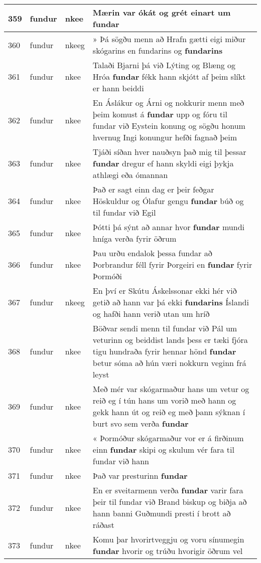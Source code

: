 \documentclass{article}
\begin{document}
\begin{longtable}{p{1cm}|p{1cm}|p{1cm}|p{13cm}}
\hline
359&fundur&nkee&Mærin var ókát og grét einart um \textbf{fundar} \\
\hline
360&fundur&nkeeg&» Þá sögðu menn að Hrafn gætti eigi miður skógarins en fundarins og \textbf{fundarins} \\
\hline
361&fundur&nkee&Talaði Bjarni þá við Lýting og Blæng og Hróa \textbf{fundar} fékk hann skjótt af þeim slíkt er hann beiddi\\
\hline
362&fundur&nkee&En Áslákur og Árni og nokkurir menn með þeim komust á \textbf{fundar} upp og fóru til fundar við Eystein konung og sögðu honum hvernug Ingi konungur hefði fagnað þeim\\
\hline
363&fundur&nkee&Tjáði síðan hver nauðsyn það mig til þessar \textbf{fundar} dregur ef hann skyldi eigi þykja athlægi eða ómannan\\
\hline
364&fundur&nkee&Það er sagt einn dag er þeir feðgar Höskuldur og Ólafur gengu \textbf{fundar} búð og til fundar við Egil\\
\hline
365&fundur&nkee&Þótti þá sýnt að annar hvor \textbf{fundar} mundi hníga verða fyrir öðrum\\
\hline
366&fundur&nkee&Þau urðu endalok þessa fundar að Þorbrandur féll fyrir Þorgeiri en \textbf{fundar} fyrir Þormóði\\
\hline
367&fundur&nkeeg&En því er Skútu Áskelssonar ekki hér við getið að hann var þá ekki \textbf{fundarins} Íslandi og hafði hann verið utan um hríð\\
\hline
368&fundur&nkee&Böðvar sendi menn til fundar við Pál um veturinn og beiddist lands þess er tæki fjóra tigu hundraða fyrir hennar hönd \textbf{fundar} betur sóma að hún væri nokkurn veginn frá leyst\\
\hline
369&fundur&nkee&Með mér var skógarmaður hans um vetur og reið eg í tún hans um vorið með hann og gekk hann út og reið eg með þann sýknan í burt svo sem verða \textbf{fundar} \\
\hline
370&fundur&nkee&« Þormóður skógarmaður vor er á firðinum einn \textbf{fundar} skipi og skulum vér fara til fundar við hann\\
\hline
371&fundur&nkee&Það var presturinn \textbf{fundar} \\
\hline
372&fundur&nkee&En er sveitarmenn verða \textbf{fundar} varir fara þeir til fundar við Brand biskup og biðja að hann banni Guðmundi presti í brott að ráðast\\
\hline
373&fundur&nkee&Komu þar hvorirtveggju og voru sínumegin \textbf{fundar} hvorir og trúðu hvorigir öðrum vel\\

\end{longtable}
\end{document}
